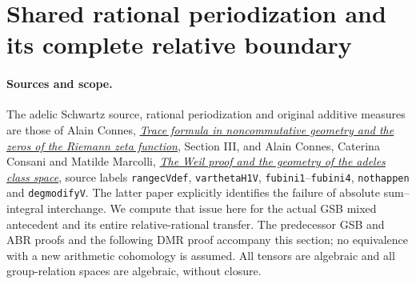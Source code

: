 \section{Shared rational periodization and its complete relative boundary}
\label{sec:shared-rational-theta}

\paragraph{Sources and scope.}
The adelic Schwartz source, rational periodization and original additive
measures are those of Alain Connes,
\href{https://arxiv.org/abs/math/9811068v1}{\emph{Trace formula in
noncommutative geometry and the zeros of the Riemann zeta function}},
Section III, and Alain Connes, Caterina Consani and Matilde Marcolli,
\href{https://arxiv.org/abs/math/0703392v1}{\emph{The Weil proof and the
geometry of the adeles class space}}, source labels \texttt{rangecVdef},
\texttt{varthetaH1V}, \texttt{fubini1}--\texttt{fubini4},
\texttt{nothappen} and \texttt{degmodifyV}. The latter paper explicitly
identifies the failure of absolute sum--integral interchange. We compute
that issue here for the actual GSB mixed antecedent and its entire
relative-rational transfer. The predecessor GSB and ABR proofs and the
following DMR proof accompany this section; no equivalence with a new
arithmetic cohomology is assumed. All tensors are algebraic and all
group-relation spaces are algebraic, without closure.

